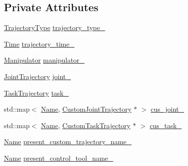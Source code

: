 \subsection*{Private Attributes}
\begin{DoxyCompactItemize}
\item 
\hyperlink{namespacerobotis__manipulator_a008c110bef924df2737c5583000a9293}{Trajectory\+Type} \hyperlink{classrobotis__manipulator_1_1_trajectory_ad21a6583cfce56cc25ea8469d77293ec}{trajectory\+\_\+type\+\_\+}
\item 
\hyperlink{structrobotis__manipulator_1_1_time}{Time} \hyperlink{classrobotis__manipulator_1_1_trajectory_ab6bc1ea3ef5611ddf84667040bf47ceb}{trajectory\+\_\+time\+\_\+}
\item 
\hyperlink{classrobotis__manipulator_1_1_manipulator}{Manipulator} \hyperlink{classrobotis__manipulator_1_1_trajectory_acd9fd9ae6cc065a10d9d438cda1081de}{manipulator\+\_\+}
\item 
\hyperlink{classrobotis__manipulator_1_1_joint_trajectory}{Joint\+Trajectory} \hyperlink{classrobotis__manipulator_1_1_trajectory_a3d59b0625d5d7033d42fb4b5ee64ba1b}{joint\+\_\+}
\item 
\hyperlink{classrobotis__manipulator_1_1_task_trajectory}{Task\+Trajectory} \hyperlink{classrobotis__manipulator_1_1_trajectory_a15902dd84985ac133318a1ac58eae093}{task\+\_\+}
\item 
std\+::map$<$ \hyperlink{namespacerobotis__manipulator_a08c2d25e77a01ad75b9bb740f8ce4765}{Name}, \hyperlink{classrobotis__manipulator_1_1_custom_joint_trajectory}{Custom\+Joint\+Trajectory} $\ast$ $>$ \hyperlink{classrobotis__manipulator_1_1_trajectory_a4424c07ba6cdfb08ca84fff0e2284f67}{cus\+\_\+joint\+\_\+}
\item 
std\+::map$<$ \hyperlink{namespacerobotis__manipulator_a08c2d25e77a01ad75b9bb740f8ce4765}{Name}, \hyperlink{classrobotis__manipulator_1_1_custom_task_trajectory}{Custom\+Task\+Trajectory} $\ast$ $>$ \hyperlink{classrobotis__manipulator_1_1_trajectory_a1b02b691bf591629f4abf8478c437216}{cus\+\_\+task\+\_\+}
\item 
\hyperlink{namespacerobotis__manipulator_a08c2d25e77a01ad75b9bb740f8ce4765}{Name} \hyperlink{classrobotis__manipulator_1_1_trajectory_aaeb1b7b142b7dd04ca7410e758549254}{present\+\_\+custom\+\_\+trajectory\+\_\+name\+\_\+}
\item 
\hyperlink{namespacerobotis__manipulator_a08c2d25e77a01ad75b9bb740f8ce4765}{Name} \hyperlink{classrobotis__manipulator_1_1_trajectory_a497b1c21424ec3a0476cf4c96a951223}{present\+\_\+control\+\_\+tool\+\_\+name\+\_\+}
\end{DoxyCompactItemize}


